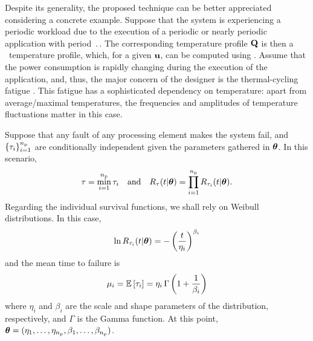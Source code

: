 Despite its generality, the proposed technique can be better appreciated considering a concrete example.
Suppose that the system is experiencing a periodic workload due to the execution of a periodic or nearly periodic application with period $\period$.
The corresponding temperature profile $\mathbf{Q}$ is then a \dss\ temperature profile, which, for a given $\mathbf{u}$, can be computed using .
Assume that the power consumption is rapidly changing during the execution of the application, and, thus, the major concern of the designer is the thermal-cycling fatigue \cite{jedec}.
This fatigue has a sophisticated dependency on temperature: apart from average/maximal temperatures, the frequencies and amplitudes of temperature fluctuations matter in this case.

Suppose that any fault of any processing element makes the system fail, and $\{ \tau_i \}_{i = 1}^{n_\text{p}}$ are conditionally independent given the parameters gathered in $\bm{\theta}$.
In this scenario,
\[
  \tau = \min_{i = 1}^{n_\text{p}} \tau_i \hspace{1em} \text{and} \hspace{1em} R_\tau(t | \bm{\theta}) = \prod_{i = 1}^{n_\text{p}} R_{\tau_i}(t | \bm{\theta}).
\]
Regarding the individual survival functions, we shall rely on Weibull distributions.
In this case,
\begin{equation} \elab{weibull-model}
  \ln \survival_{\T_i}(\t | \pvw) = -\left( \frac{\t}{\eta_i} \right)^{\beta_i}
\end{equation}
and the mean time to failure is
\begin{equation} \elab{weibull-expectation}
  \mu_i = \expectation{\T_i} = \eta_i \, \Gamma\left(1 + \frac{1}{\beta_i}\right)
\end{equation}
where $\eta_i$ and $\beta_i$ are the scale and shape parameters of the distribution, respectively, and $\Gamma$ is the Gamma function.
At this point, $\bm{\theta} = (\eta_1, \dotsc, \eta_{n_\text{p}}, \beta_1, \dotsc, \beta_{n_\text{p}})$.

